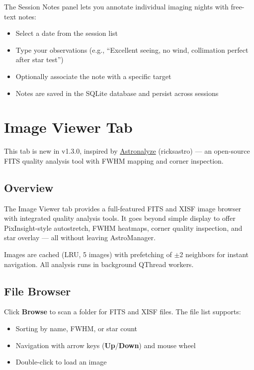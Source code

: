 \documentclass[11pt,a4paper]{article}
\begin{document}
The Session Notes panel lets you annotate individual imaging nights with free-text notes:

\begin{itemize}
    \item Select a date from the session list
    \item Type your observations (e.g., ``Excellent seeing, no wind, collimation perfect after star test'')
    \item Optionally associate the note with a specific target
    \item Notes are saved in the SQLite database and persist across sessions
\end{itemize}


\section{Image Viewer Tab}
\label{sec:imageviewer}

\begin{newfeaturebox}[New in v1.3.0]
This tab is new in v1.3.0, inspired by \href{https://github.com/ricksastro/Astronalyze}{Astronalyze} (ricksastro) --- an open-source FITS quality analysis tool with FWHM mapping and corner inspection.
\end{newfeaturebox}

\subsection{Overview}

The Image Viewer tab provides a full-featured FITS and XISF image browser with integrated quality analysis tools. It goes beyond simple display to offer PixInsight-style autostretch, FWHM heatmaps, corner quality inspection, and star overlay --- all without leaving AstroManager.

Images are cached (LRU, 5 images) with prefetching of $\pm$2 neighbors for instant navigation. All analysis runs in background QThread workers.

\subsection{File Browser}

Click \textbf{Browse} to scan a folder for FITS and XISF files. The file list supports:
\begin{itemize}
    \item Sorting by name, FWHM, or star count
    \item Navigation with arrow keys (\textbf{Up}/\textbf{Down}) and mouse wheel
    \item Double-click to load an image
\end{itemize}
\end{document}
